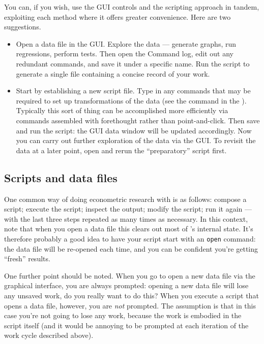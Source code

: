 You can, if you wish, use the GUI controls and the scripting approach
in tandem, exploiting each method where it offers greater convenience.
Here are two suggestions.

\begin{itemize}
\item Open a data file in the GUI.  Explore the data --- generate
  graphs, run regressions, perform tests.  Then open the Command log,
  edit out any redundant commands, and save it under a specific name.
  Run the script to generate a single file containing a concise record
  of your work.
\item Start by establishing a new script file.  Type in any commands
  that may be required to set up transformations of the data (see the
   command in the \GCR). Typically this sort of thing can be
  accomplished more efficiently via commands assembled with
  forethought rather than point-and-click. Then save and run the
  script: the GUI data window will be updated accordingly.  Now you
  can carry out further exploration of the data via the GUI.  To
  revisit the data at a later point, open and rerun the
  ``preparatory'' script first.
\end{itemize}

\subsection{Scripts and data files}

One common way of doing econometric research with  is as
follows: compose a script; execute the script; inspect the output;
modify the script; run it again --- with the last three steps repeated
as many times as necessary.  In this context, note that when you open
a data file this clears out most of 's internal state.
It's therefore probably a good idea to have your script start with an
\texttt{open} command: the data file will be re-opened each time, and
you can be confident you're getting ``fresh'' results.

One further point should be noted.  When you go to open a new data
file via the graphical interface, you are always prompted: opening a
new data file will lose any unsaved work, do you really want to do
this?  When you execute a script that opens a data file, however, you
are \textit{not} prompted.  The assumption is that in this case you're
not going to lose any work, because the work is embodied in the script
itself (and it would be annoying to be prompted at each iteration of
the work cycle described above).   

